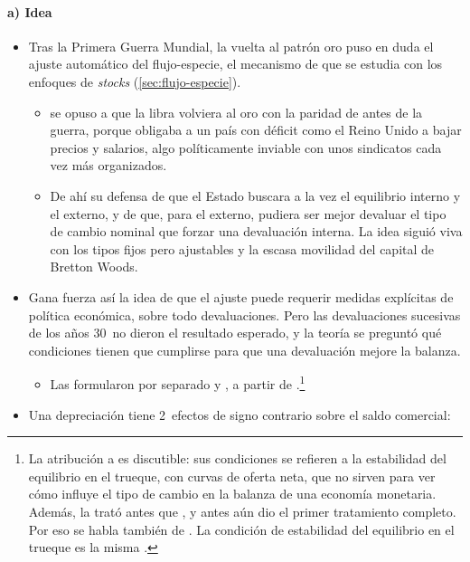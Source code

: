 \documentclass[11pt]{article}
\begin{document}
\paragraph{a) Idea}

\begin{itemize}
\item Tras la Primera Guerra Mundial, la vuelta al patrón oro puso en duda el ajuste automático del flujo-especie, el mecanismo de  que se estudia con los enfoques de \emph{stocks} (\ref{sec:flujo-especie}).
  \begin{itemize}
  \item {} se opuso a que la libra volviera al oro con la paridad de antes de la guerra, porque obligaba a un país con déficit como el Reino Unido a bajar precios y salarios, algo políticamente inviable con unos sindicatos cada vez más organizados\nocite{Keynes1925Economic}.
  \item De ahí su defensa de que el Estado buscara a la vez el equilibrio interno y el externo, y de que, para el externo, pudiera ser mejor devaluar el tipo de cambio nominal que forzar una devaluación interna. La idea siguió viva con los tipos fijos pero ajustables y la escasa movilidad del capital de Bretton Woods.
  \end{itemize}
\item Gana fuerza así la idea de que el ajuste puede requerir medidas explícitas de política económica, sobre todo devaluaciones. Pero las devaluaciones sucesivas de los años 30~no dieron el resultado esperado, y la teoría se preguntó qué condiciones tienen que cumplirse para que una devaluación mejore la balanza.
  \begin{itemize}
  \item Las formularon por separado \textcite{Robinson1937Foreign} y \textcite[cap.~28]{Lerner1944}, a partir de \textcite{Marshall1923}.\footnote{La atribución a  es discutible: sus condiciones se refieren a la estabilidad del equilibrio en el trueque, con curvas de oferta neta, que no sirven para ver cómo influye el tipo de cambio en la balanza de una economía monetaria. Además,  la trató antes que , y antes aún \textcite{Bickerdike1920Instability} dio el primer tratamiento completo. Por eso se habla también de \nocite{Gandolfo2016International}. La condición de estabilidad del equilibrio en el trueque es la misma .}
  \end{itemize}
\item Una depreciación tiene 2~efectos de signo contrario sobre el saldo comercial:

\end{itemize}
\end{document}

